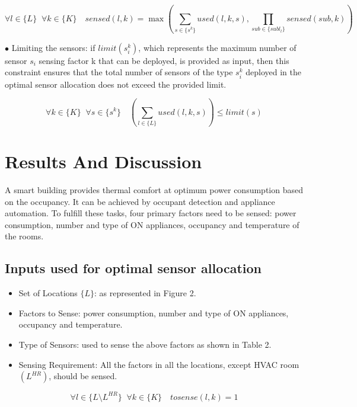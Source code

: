 \documentclass[]{interact}
\theoremstyle{plain}%
\theoremstyle{definition}
\theoremstyle{remark}
\begin{document}
  \begin{equation}
    \forall l \in \{L\} \;\; \forall k \in \{K\} \quad sensed(l,k) = \max \left(
  \sum_{s \in \{s^k\}}  used(l,k,s) , 
  \prod_{sub \in \{subl_l\}} sensed(sub,k)
  \right)
  \end{equation}

  \noindent $\bullet$ Limiting the sensors: if $limit(s_i^k)$, which represents the maximum number of sensor $s_i$ sensing factor k that can be deployed, is provided as input, then this constraint ensures that the total number of sensors of the type $s_i^k$ deployed in the optimal sensor allocation does not exceed the provided limit.

 \begin{equation}
    \forall k \in \{K\} \;\; \forall s \in \{s^k\} \quad \left(
      \sum_{l \in \{L\}} used(l,k,s)
    \right) \leq limit(s)
   \end{equation}

\section{Results And Discussion}

A smart building provides thermal comfort at optimum power consumption based on the occupancy. It can be achieved by occupant detection and appliance automation. To fulfill these tasks, four primary factors need to be sensed: power consumption, number and type of ON appliances, occupancy and temperature of the rooms.

\subsection{Inputs used for optimal sensor allocation}

\begin{itemize}
  \item Set of Locations $\{L\}$: as represented in Figure 2.
  \item Factors to Sense: power consumption, number and type of ON appliances, occupancy and temperature.
  \item Type of Sensors: used to sense the above factors as shown in Table 2.
  \item Sensing Requirement: All the factors in all the locations, except HVAC room $(L^{HR})$, should be sensed. 
\end{itemize}
  
\begin{equation}
  \forall l \in \{L \setminus L^{HR} \} \;\; \forall k \in \{K\} \quad tosense(l,k) = 1
\end{equation}
\end{document}
